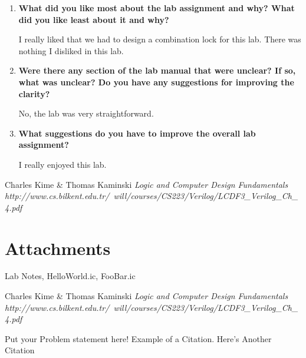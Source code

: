 \documentclass[a4paper,12pt]{article}
\begin{document}
\begin{enumerate}
  \item \textbf{What did you like most about the lab assignment and why? What did you like least about it and why?}

  I really liked that we had to design a combination lock for this lab. There was nothing I disliked in this lab.

  \item \textbf{Were there any section of the lab manual that were unclear? If so, what was unclear? Do you have any suggestions for improving the clarity?}

  No, the lab was very straightforward. 

  \item \textbf{What suggestions do you have to improve the overall lab assignment?}
  
  I really enjoyed this lab.
  \vspace{10pt}

\end{enumerate}

\ifx
\begin{thebibliography}{1}
 Charles Kime \& Thomas Kaminski  \emph{Logic and Computer Design Fundamentals} \\ \hspace{15pt}\textit{http://www.cs.bilkent.edu.tr/~will/courses/CS223/Verilog/LCDF3_Verilog_Ch_4.pdf}
\end{thebibliography}

\section*{Attachments}
Lab Notes, HelloWorld.ic, FooBar.ic

\begin{thebibliography}{9}
 Charles Kime & Thomas Kaminski  \emph{Logic and Computer Design Fundamentals} \textit{http://www.cs.bilkent.edu.tr/~will/courses/CS223/Verilog/LCDF3_Verilog_Ch_4.pdf}
\end{thebibliography}

Put your Problem statement here! Example of a Citation\cite[p.219]{Robotics}. Here's Another Citation\cite{Flueck}
\fi
\end{document}
